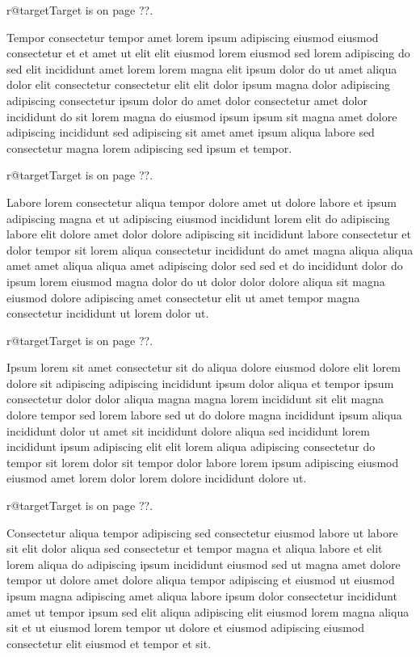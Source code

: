 \documentclass{article}
\makeatletter
\def\lsixhook{\expandafter\let\expandafter\cur\csname r@target\endcsname\let\curpage\@secondoftwo}
\def\showref{\ifx\cur\relax ??\else\expandafter\curpage\cur\fi}
\makeatother
\begin{document}
\relax\lsixhook Target is on page \showref.

Tempor consectetur tempor amet lorem ipsum adipiscing eiusmod eiusmod consectetur et et amet ut elit elit eiusmod lorem eiusmod sed lorem adipiscing do sed elit incididunt amet lorem lorem magna elit ipsum dolor do ut amet aliqua dolor elit consectetur consectetur elit elit dolor ipsum magna dolor adipiscing adipiscing consectetur ipsum dolor do amet dolor consectetur amet dolor incididunt do sit lorem magna do eiusmod ipsum ipsum sit magna amet dolore adipiscing incididunt sed adipiscing sit amet amet ipsum aliqua labore sed consectetur magna lorem adipiscing sed ipsum et tempor.

\relax\lsixhook Target is on page \showref.

Labore lorem consectetur aliqua tempor dolore amet ut dolore labore et ipsum adipiscing magna et ut adipiscing eiusmod incididunt lorem elit do adipiscing labore elit dolore amet dolor dolore adipiscing sit incididunt labore consectetur et dolor tempor sit lorem aliqua consectetur incididunt do amet magna aliqua aliqua amet amet aliqua aliqua amet adipiscing dolor sed sed et do incididunt dolor do ipsum lorem eiusmod magna dolor do ut dolor dolor dolore aliqua sit magna eiusmod dolore adipiscing amet consectetur elit ut amet tempor magna consectetur incididunt ut lorem dolor ut.

\relax\lsixhook Target is on page \showref.

Ipsum lorem sit amet consectetur sit do aliqua dolore eiusmod dolore elit lorem dolore sit adipiscing adipiscing incididunt ipsum dolor aliqua et tempor ipsum consectetur dolor dolor aliqua magna magna lorem incididunt sit elit magna dolore tempor sed lorem labore sed ut do dolore magna incididunt ipsum aliqua incididunt dolor ut amet sit incididunt dolore aliqua sed incididunt lorem incididunt ipsum adipiscing elit elit lorem aliqua adipiscing consectetur do tempor sit lorem dolor sit tempor dolor labore lorem ipsum adipiscing eiusmod eiusmod amet lorem dolor lorem dolore incididunt dolore ut.

\relax\lsixhook Target is on page \showref.

Consectetur aliqua tempor adipiscing sed consectetur eiusmod labore ut labore sit elit dolor aliqua sed consectetur et tempor magna et aliqua labore et elit lorem aliqua do adipiscing ipsum incididunt eiusmod sed ut magna amet dolore tempor ut dolore amet dolore aliqua tempor adipiscing et eiusmod ut eiusmod ipsum magna adipiscing amet aliqua labore ipsum dolor consectetur incididunt amet ut tempor ipsum sed elit aliqua adipiscing elit eiusmod lorem magna aliqua sit et ut eiusmod lorem tempor ut dolore et eiusmod adipiscing eiusmod consectetur elit eiusmod et tempor et sit.
\end{document}
